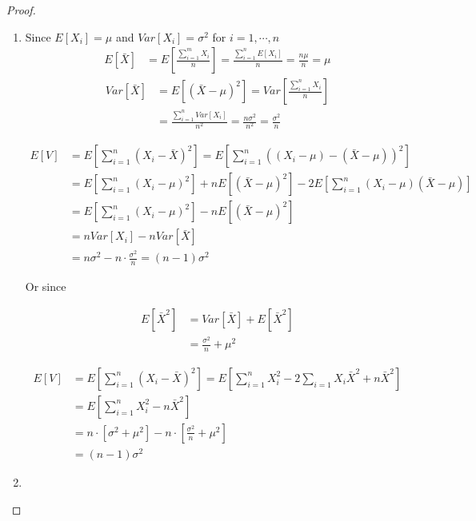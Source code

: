 \documentclass[a4paper, 11pt]{article}
\begin{document}
\begin{proof}
\begin{enumerate}[label=(\alph*)]
	\item Since $E[X_i]=\mu$ and $Var[X_i]=\sigma^2$ for $i=1,\cdots,n$
	\begin{align*}
		E[\bar{X}]&= E\left[\frac{\sum_{i=1}^m X_i}{n}\right]= \frac{\sum_{i=1}^n E[X_i]}{n}= \frac{n\mu}{n}=\mu
	\end{align*}
	\begin{align*}
	Var\left[\bar{X}\right]&=E\left[\left(\bar{X}-\mu\right)^2\right]= Var\left[\frac{\sum_{i=1}^nX_i}{n}\right]\\&= \frac{\sum_{i=1}^n Var[X_i]}{n^2} = \frac{n\sigma^2}{n^2}=\frac{\sigma^2}{n}
	\end{align*}
	
	\begin{align*}
	E\left[V\right]& = E\left[\sum_{i=1}^n\left(X_i-\bar{X}\right)^2\right]=E\left[\sum_{i=1}^n\left((X_i-\mu)-(\bar{X}-\mu)\right)^2\right]\\
& = 	E\left[ \sum_{i=1}^n \left(X_i-\mu\right)^2 \right]+ n E\left[\left(\bar{X}-\mu\right)^2\right]-2E\left[ \sum_{i=1}^n (X_i-\mu)(\bar{X}-\mu)\right]\\& = E\left[ \sum_{i=1}^n \left(X_i-\mu\right)^2 \right]- n E\left[\left(\bar{X}-\mu\right)^2\right]\\
&= n Var[X_i]- nVar[\bar{X}]\\
& = n\sigma^2 - n\cdot\frac{\sigma^2}{n}=(n-1)\sigma^2
	\end{align*}
	
	Or since 
	
	\begin{align*}
	E\left[\bar{X}^2\right]& =Var[\bar{X}]+E[\bar{X}^2]\\
	& = \frac{\sigma^2}{n}+\mu^2
	\end{align*}
	
	\begin{align*}
	E\left[V\right]& = E\left[\sum_{i=1}^n\left(X_i-\bar{X}\right)^2\right]=E\left[ \sum_{i=1}^n X_i^2-2\sum_{i=1}X_i\bar{X}^2+ n\bar{X}^2\right]\\
	& = E\left[\sum_{i=1}^nX_i^2-n\bar{X}^2\right]\\
	& =n\cdot\left[\sigma^2+\mu^2\right]-n\cdot\left[  \frac{\sigma^2}{n}+\mu^2\right]\\
	& = (n-1)\sigma^2
	\end{align*}
	
	\item 


\end{enumerate}
\end{proof}
\end{document}
